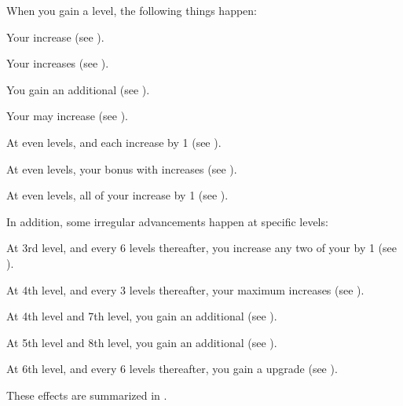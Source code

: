     When you gain a level, the following things happen:
    \begin{raggeditemize}
        \item Your  increase (see ).
        \item Your  increases (see ).
        \item You gain an additional  (see ).
        \item Your  may increase (see ).
        \item At even levels,  and  each increase by 1 (see ).
        \item At even levels, your bonus with  increases (see ).
        \item At even levels, all of your  increase by 1 (see ).
    \end{raggeditemize}

    In addition, some irregular advancements happen at specific levels:
    \begin{raggeditemize}
        \item At 3rd level, and every 6 levels thereafter, you increase any two of your  by 1 (see ).
        \item At 4th level, and every 3 levels thereafter, your maximum  increases (see ).
        \item At 4th level and 7th level, you gain an additional  (see ).
        \item At 5th level and 8th level, you gain an additional  (see ).
        \item At 6th level, and every 6 levels thereafter, you gain a  upgrade (see ).
    \end{raggeditemize}

    These effects are summarized in .

